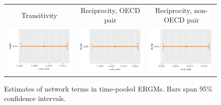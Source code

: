 \documentclass[reqno,onecolumn,letterpaper,12pt]{article}
\begin{document}
\begin{figure}[htp]
\centering
\begin{tabular}{@{\hskip -.05cm}c@{\hskip .2cm}c@{\hskip .2cm}c}
Transitivity  & Reciprocity, OECD pair &Reciprocity, non-OECD pair\\
\includegraphics[height=.165\textheight, clip=true, trim=1.3cm .5cm 0cm .1cm]{SI_figures/rl_TERGM_plots/Transitivity.pdf}   &
\includegraphics[height=.165\textheight, clip=true, trim=1.3cm .5cm 0cm .1cm]{SI_figures/rl_TERGM_plots/Mutuality_OECD_Pair.pdf}    &
\includegraphics[height=.165\textheight, clip=true, trim=1.3cm .5cm 0cm .1cm]{SI_figures/rl_TERGM_plots/Mutuality_Not_OECD_Pair.pdf} \\
\end{tabular}
\caption{\label{fig:net_effects} Estimates of network terms in time-pooled ERGMs. Bars span 95\% confidence intervals.}
\end{figure}
\end{document}
